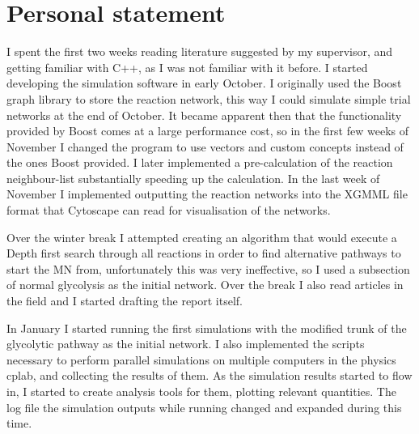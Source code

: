 \documentclass[a4paper,12pt]{article}
\begin{document}
%	
%
%
%
%
%
%


	\newpage
	\section*{Personal statement}
	I spent the first two weeks reading literature suggested by my supervisor, and getting familiar with C++, as I was not familiar with it before. 
	I started developing the simulation software in early October. 	I originally used the Boost graph library to store the reaction network, this way I could simulate simple trial networks at the end of October. It became apparent then that the functionality provided by Boost comes at a large performance cost, so in the first few weeks of November I changed the program to use vectors and custom concepts instead of the ones Boost provided. I later implemented a pre-calculation of the reaction neighbour-list substantially speeding up the calculation. 
	In the last week of November I implemented outputting the reaction networks into the XGMML file format that Cytoscape can read for visualisation of the networks. 

	Over the winter break I attempted creating an algorithm that would execute a Depth first search through all reactions in order to find alternative pathways to start the MN from, unfortunately this was very ineffective, so I used a subsection of normal glycolysis as the initial network. Over the break I also read articles in the field and I started drafting the report itself. 

	In January I started running the first simulations with the modified trunk of the glycolytic pathway as the initial network. I also implemented the scripts necessary to perform parallel simulations on multiple computers in the physics cplab, and collecting the results of them. 
	As the simulation results started to flow in, I started to create analysis tools for them, plotting relevant quantities. The log file the simulation outputs while running changed and expanded during this time. 
\end{document}

